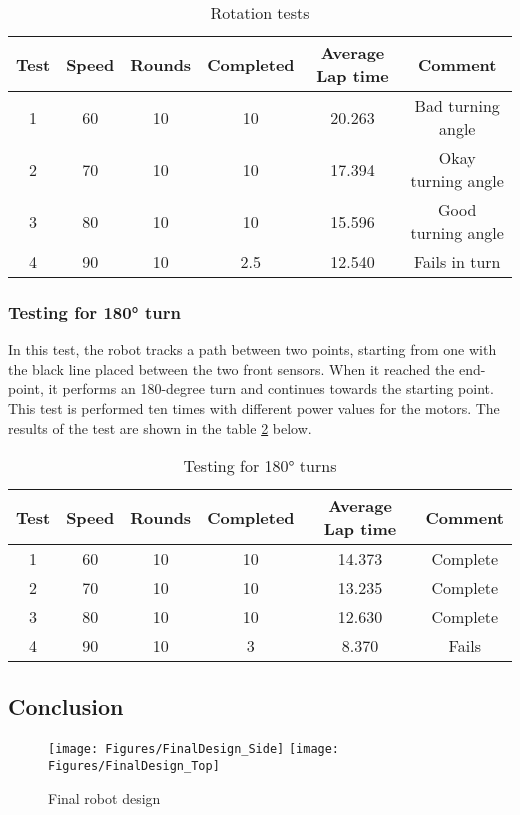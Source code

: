 \documentclass[a4paper,12pt]{article}
\begin{document}
\begin{table}[h!]
\centering
\begin{tabular}{|c|c|c|c|c|c|}
 \hline
Test & Speed & Rounds & Completed &  Average Lap time & Comment\\ [0.5ex]
 \hline\hline
 1 & 60  & 10 & 10 & 20.263 & Bad turning angle \\
 2 & 70  & 10 & 10 & 17.394 & Okay turning angle\\
 3 & 80 & 10 & 10 &  15.596 & Good turning angle\\
 4 & 90 & 10 & 2.5 & 12.540 & Fails in turn \\[1ex]
 \hline
\end{tabular}
\caption{Rotation tests}
\label{table:rotation}
\end{table}

\subsubsection{Testing for 180° turn}
In this test, the robot tracks a path between two points, starting from one with the black line placed between the two front sensors. When it reached the end-point, it performs an 180-degree turn and continues towards the starting point. This test is performed ten times with different power values for the motors. The results of the test are shown in the table \ref{table:180turn} below.

\begin{table}[h!]
\centering
\begin{tabular}{|c|c|c|c|c|c|}
 \hline
Test & Speed & Rounds & Completed & Average Lap time & Comment \\ [0.5ex]
 \hline\hline
 1 & 60 & 10 & 10 & 14.373 &  Complete \\
 2 & 70 & 10 & 10 & 13.235 &  Complete \\
 3 & 80 & 10 & 10  & 12.630 &  Complete \\
 4 & 90 & 10 &  3 & 8.370  &  Fails  \\[1ex]
 \hline
\end{tabular}
\caption{Testing for 180° turns}
\label{table:180turn}
\end{table}



\subsection{Conclusion}

\begin{figure}[ht]
\centering
\texttt{[image: Figures/FinalDesign\_Side]}
\texttt{[image: Figures/FinalDesign\_Top]}
\caption{Final robot design}
\label{fig:finaldesign}
\end{figure}
\end{document}
